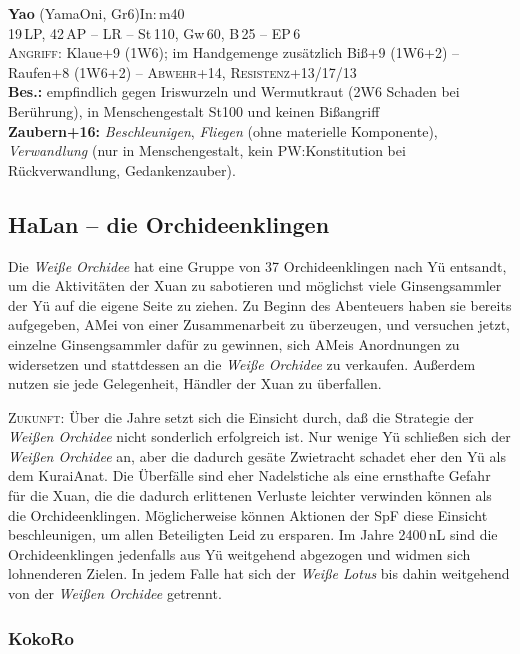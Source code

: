 \documentclass[
a4paper,
twoside,
DIV=calc,
BCOR=4mm,
fontsize=9pt,
twocolumn=on,
titlepage=on,
parskip=half
]{scrartcl}
\begin{document}
\textbf{Yao} (YamaOni, Gr6)\hfill In:\,m40\\
19\,LP, 42\,AP -- LR -- St\,110, Gw\,60, B\,25 -- EP\,6\\
\textsc{Angriff:} Klaue+9 (1W6); im Handgemenge zusätzlich Biß+9
(1W6+2) -- Raufen+8 (1W6+2) -- \textsc{Abwehr}+14,
\textsc{Resistenz}+13/17/13\\
\textbf{Bes.:} empfindlich gegen Iriswurzeln und Wermutkraut (2W6
Schaden bei Berührung), in Menschengestalt St100 und keinen Bißangriff\\
\textbf{Zaubern+16:} \emph{Beschleunigen}, \emph{Fliegen} (ohne
materielle Komponente), \emph{Verwandlung} (nur in Menschengestalt,
kein PW:Konstitution bei Rückverwandlung, Gedankenzauber).

\subsection{HaLan -- die Orchideenklingen}

Die \emph{Weiße Orchidee} hat eine Gruppe von 37 Orchideenklingen nach
Yü entsandt, um die Aktivitäten der Xuan zu sabotieren und möglichst
viele Ginsengsammler der Yü auf die eigene Seite zu ziehen. Zu Beginn
des Abenteuers haben sie bereits aufgegeben, AMei von einer
Zusammenarbeit zu überzeugen, und versuchen jetzt, einzelne
Ginsengsammler dafür zu gewinnen, sich AMeis Anordnungen zu
widersetzen und stattdessen an die \emph{Weiße Orchidee} zu
verkaufen. Außerdem nutzen sie jede Gelegenheit, Händler der Xuan zu
überfallen.

\textsc{Zukunft:} Über die Jahre setzt sich die Einsicht durch, daß
die Strategie der \emph{Weißen Orchidee} nicht sonderlich erfolgreich
ist. Nur wenige Yü schließen sich der \emph{Weißen Orchidee} an, aber
die dadurch gesäte Zwietracht schadet eher den Yü als dem KuraiAnat.
Die Überfälle sind eher Nadelstiche als eine ernsthafte Gefahr für die
Xuan, die die dadurch erlittenen Verluste leichter verwinden können als
die Orchideenklingen. Möglicherweise können Aktionen der SpF diese
Einsicht beschleunigen, um allen Beteiligten Leid zu ersparen. Im
Jahre 2400\,nL sind die Orchideenklingen jedenfalls aus Yü weitgehend
abgezogen und widmen sich lohnenderen Zielen. In jedem Falle hat sich
der \emph{Weiße Lotus} bis dahin weitgehend von der \emph{Weißen
  Orchidee} getrennt.

\subsubsection{KokoRo}
\end{document}
